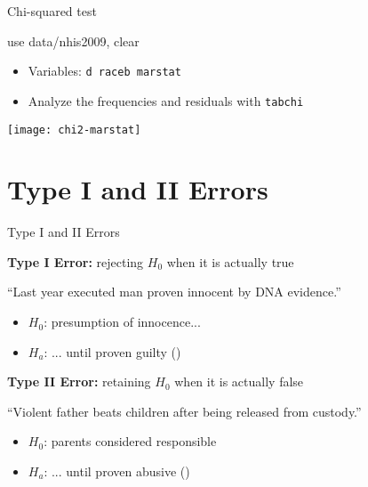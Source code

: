 \documentclass[t]{beamer}
\begin{document}
	\begin{frame}[t]{Chi-squared test}
		
		\begin{exampleblock}{use data/nhis2009, clear}
		
			\begin{itemize}
				\item Variables: \texttt{d raceb marstat}
							
				\item Analyze the frequencies and residuals with \texttt{tabchi}
								
			
			\end{itemize}

		\end{exampleblock}
		
		\begin{center}
			\texttt{[image: chi2-marstat]}
		\end{center}
		
	\end{frame}
	
	\section{Type I and II Errors}

	\begin{frame}[t]{Type I and II Errors}

		\begin{block}{\textbf{Type I Error:} rejecting $H_0$ %
					when it is actually true}

			``Last year executed man proven innocent by DNA evidence.''
					
			\begin{itemize}
				\item $H_0$: presumption of innocence...
				\item $H_a$: ... until proven guilty ()
			\end{itemize}
		\end{block}
		
		\begin{block}{\textbf{Type II Error:} retaining $H_0$ %
					when it is actually false}

			``Violent father beats children after being released from custody.''
					
			\begin{itemize}
				\item $H_0$: parents considered responsible
				\item $H_a$: ... until proven abusive ()
			\end{itemize}

		\end{block}

	\end{frame}
\end{document}
